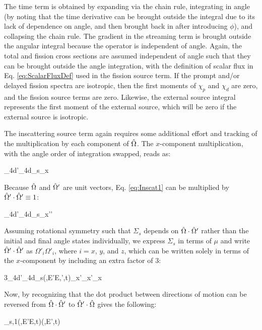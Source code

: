 The time term is obtained by expanding via the chain rule, integrating in angle (by noting that the time derivative can be brought outside the integral due to its lack of dependence on angle, and then brought back in after introducing \(\phi\)), and collapsing the chain rule. The gradient in the streaming term is brought outside the angular integral because the operator is independent of angle. Again, the total and fission cross sections are assumed independent of angle such that they can be brought outside the angle integration, with the definition of scalar flux in Eq. \eqref{eq:ScalarFluxDef} used in the fission source term. If the prompt and/or delayed fission spectra are isotropic, then the first moments of \(\chi_p\) and \(\chi_d\) are zero, and the fission source terms are zero. Likewise, the external source integral represents the first moment of the external source, which will be zero if the external source is isotropic.

The inscattering source term again requires some additional effort and tracking of the multiplication by each component of \(\hat{\Omega}\). The \(x\)-component multiplication, with the angle order of integration swapped, reads as:

\beq
\label{eq:Inscat1}
\int_{4\pi}d\hO'\dEprime \int_{4\pi}d\hO\Sigma_s\seatout\psi\seatelse\Omega_x
\eeq

Because \(\hat{\Omega}\) and \(\hat{\Omega}'\) are unit vectors, Eq. \eqref{eq:Inscat1} can be multiplied by \(\hat{\Omega}'\cdot\hat{\Omega}'\equiv1\):

\beq
\label{sec:Inscat1}
\int_{4\pi}d\hO'\dEprime \int_{4\pi}d\hO\Sigma_s\seatout\psi\seatelse\Omega_x\hO'\cdot\hO'
\eeq

Assuming rotational symmetry such that \(\Sigma_s\) depends on \(\hat{\Omega}\cdot\hat{\Omega}'\) rather than the initial and final angle states individually, we express \(\Sigma_s\) in terms of \(\mu\) and write \(\hat{\Omega}'\cdot\hat{\Omega}'\) as \(\Omega'_i\Omega'_i\), where \(i=x\), \(y\), and \(z\), which can be written solely in terms of the \(x\)-component by including an extra factor of 3:

\beq
\label{sec:Inscat2}
3\int_{4\pi}d\hO'\dEprime \int_{4\pi}d\hO\Sigma_s(,E'\rightarrow E,\hO'\cdot\hO,t)\psi\seatelse\Omega_x\Omega'_x\Omega'_x
\eeq

Now, by recognizing that the dot product between directions of motion can be reversed from \(\hat{\Omega}\cdot\hat{\Omega}'\) to \(\hat{\Omega}'\cdot\hat{\Omega}\) gives the following:

\beq
\label{eq:Inscat2}
\dEprime \Sigma_{s,1}(,E'\rightarrow E,t)(,E',t)
\eeq

